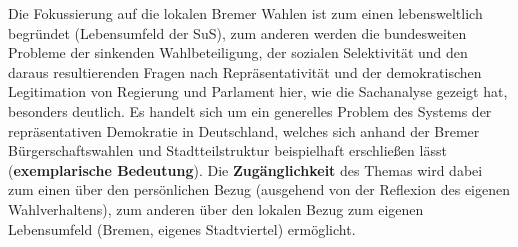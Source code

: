 Die Fokussierung auf die lokalen Bremer Wahlen ist zum einen lebensweltlich
begründet (Lebensumfeld der SuS), zum anderen werden die bundesweiten Probleme
der sinkenden Wahlbeteiligung, der sozialen Selektivität und den daraus
resultierenden Fragen nach Repräsentativität und der demokratischen
Legitimation von Regierung und Parlament hier, wie die Sachanalyse gezeigt hat,
besonders deutlich. Es handelt sich um ein generelles Problem des Systems der
repräsentativen Demokratie in Deutschland, welches sich anhand der Bremer
Bürgerschaftswahlen und Stadtteilstruktur beispielhaft erschließen lässt
(\textbf{exemplarische Bedeutung}). Die \textbf{Zugänglichkeit} des Themas wird
dabei zum einen über den persönlichen Bezug (ausgehend von der Reflexion des
eigenen Wahlverhaltens), zum anderen über den lokalen Bezug zum eigenen
Lebensumfeld (Bremen, eigenes Stadtviertel) ermöglicht.
